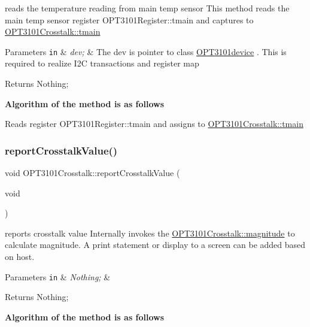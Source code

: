 reads the temperature reading from main temp sensor This method reads the main temp sensor register O\+P\+T3101\+Register\+::tmain and captures to \mbox{\hyperlink{class_o_p_t3101_crosstalk_af5ac7c2a662a32e1ad954412a3c8d6ea}{O\+P\+T3101\+Crosstalk\+::tmain}} 


\begin{DoxyParams}[1]{Parameters}
\mbox{\tt in}  & {\em dev;} & The dev is pointer to class \mbox{\hyperlink{class_o_p_t3101device}{O\+P\+T3101device}} . This is required to realize I2C transactions and register map \\
\hline
\end{DoxyParams}
\begin{DoxyReturn}{Returns}
Nothing; 
\end{DoxyReturn}
{\bfseries Algorithm of the method is as follows}


\begin{DoxyItemize}
\item Reads register O\+P\+T3101\+Register\+::tmain and assigns to \mbox{\hyperlink{class_o_p_t3101_crosstalk_af5ac7c2a662a32e1ad954412a3c8d6ea}{O\+P\+T3101\+Crosstalk\+::tmain}} 
\end{DoxyItemize}\mbox{\label{class_o_p_t3101_crosstalk_a50fc2fb4ea51ad52d25bcd3001afb3fc}} 
\subsubsection{\texorpdfstring{report\+Crosstalk\+Value()}{reportCrosstalkValue()}}
{\footnotesize\ttfamily void O\+P\+T3101\+Crosstalk\+::report\+Crosstalk\+Value (\begin{DoxyParamCaption}\item[{void}]{ }\end{DoxyParamCaption})}



reports crosstalk value Internally invokes the \mbox{\hyperlink{class_o_p_t3101_crosstalk_acb6217116c652bc7c0c84e7b86504f18}{O\+P\+T3101\+Crosstalk\+::magnitude}} to calculate magnitude. A print statement or display to a screen can be added based on host. 


\begin{DoxyParams}[1]{Parameters}
\mbox{\tt in}  & {\em Nothing;} & \\
\hline
\end{DoxyParams}
\begin{DoxyReturn}{Returns}
Nothing; 
\end{DoxyReturn}
{\bfseries Algorithm of the method is as follows}



